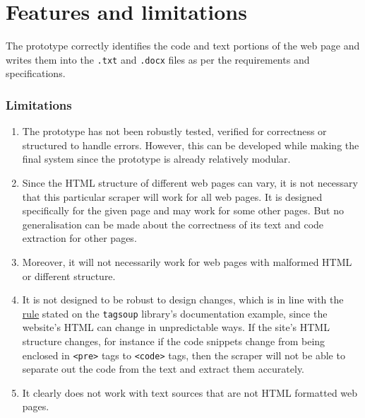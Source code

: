 \documentclass[12pt]{scrreprt}
\begin{document}



\section{Features and limitations}

The prototype correctly identifies the code and text portions of the web page and writes them into the \texttt{.txt} and \texttt{.docx} files as per the requirements and specifications. 

\subsubsection{Limitations}



\begin{enumerate}
            \item The prototype has not been robustly tested, verified for correctness or structured to handle errors. However, this can be developed while making the final system since the prototype is already relatively modular.
            \item Since the HTML structure of different web pages can vary, it is not necessary that this particular scraper will work for all web pages. It is designed specifically for the given page and may work for some other pages. But no generalisation can be made about the correctness of its text and code extraction for other pages.
            \item Moreover, it will not necessarily work for web pages with malformed HTML or different structure.
            \item It is not designed to be robust to design changes, which is in line with the \href{https://hackage.haskell.org/package/tagsoup-0.6/src/tagsoup.htm#:~:text=Rule%202%3A%0ADo%20not%20be%20robust%20to%20design%20changes%2C%20do%20not%20even%20consider%20the%20possibility%20when%20writing%20the%20code.}{rule} stated on the \texttt{tagsoup} library's documentation example, since the website's HTML can change in unpredictable ways. If the site's HTML structure changes, for instance if the code snippets change from being enclosed in \texttt{<pre>} tags to \texttt{<code>} tags, then the scraper will not be able to separate out the code from the text and extract them accurately.
            \item It clearly does not work with text sources that are not HTML formatted web pages.
\end{enumerate}
\end{document}
